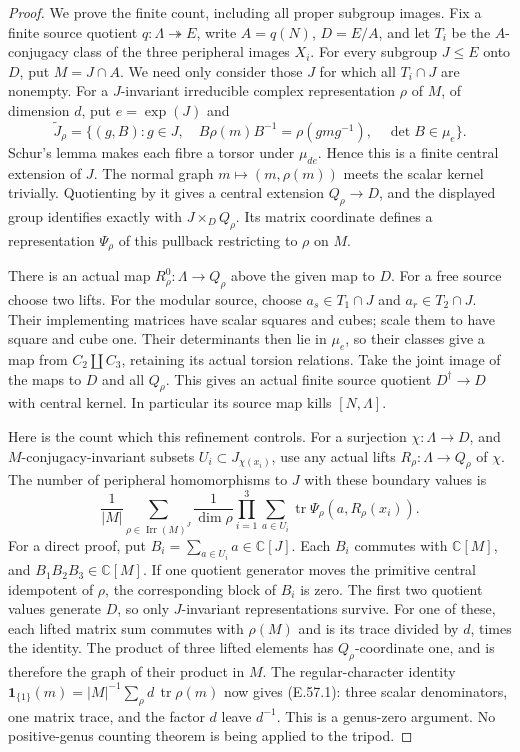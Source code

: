 \begin{proof}
We prove the finite count, including all proper subgroup images.
Fix a finite source quotient \(q:\Lambda\twoheadrightarrow E\),
write \(A=q(N)\), \(D=E/A\), and let \(T_i\) be the
\(A\)-conjugacy class of the three peripheral images \(X_i\).
For every subgroup \(J\le E\) onto \(D\), put \(M=J\cap A\).
We need only consider those \(J\) for which all \(T_i\cap J\)
are nonempty. For a \(J\)-invariant irreducible complex representation
\(\rho\) of \(M\), of dimension \(d\), put \(e=\exp(J)\) and
\[
 \widetilde J_\rho=\{(g,B):g\in J,\quad
 B\rho(m)B^{-1}=\rho(gmg^{-1}),\quad\det B\in\mu_e\}.
\]
Schur's lemma makes each fibre a torsor under \(\mu_{de}\).
Hence this is a finite central extension of \(J\). The normal graph
\(m\mapsto(m,\rho(m))\) meets the scalar kernel trivially.
Quotienting by it gives a central extension \(Q_\rho\to D\),
and the displayed group identifies exactly with
\(J\times_DQ_\rho\). Its matrix coordinate defines a representation
\(\Psi_\rho\) of this pullback restricting to \(\rho\) on \(M\).

There is an actual map \(R_\rho^0:\Lambda\to Q_\rho\) above
the given map to \(D\). For a free source choose two lifts. For the
modular source, choose \(a_s\in T_1\cap J\) and
\(a_r\in T_2\cap J\). Their implementing matrices have scalar
squares and cubes; scale them to have square and cube one. Their
determinants then lie in \(\mu_e\), so their classes give a map
from \(C_2\amalg C_3\), retaining its actual torsion relations.
Take the joint image of the maps to \(D\) and all \(Q_\rho\).
This gives an actual finite source quotient \(D^\dagger\to D\)
with central kernel. In particular its source map kills
\([N,\Lambda]\).

Here is the count which this refinement controls. For a surjection
\(\chi:\Lambda\to D\), and \(M\)-conjugacy-invariant subsets
\(U_i\subset J_{\chi(x_i)}\), use any actual lifts
\(R_\rho:\Lambda\to Q_\rho\) of \(\chi\). The number of
peripheral homomorphisms to \(J\) with these boundary values is
\[
 \frac1{|M|}\sum_{\rho\in\operatorname{Irr}(M)^J}
 \frac1{\dim\rho}
 \prod_{i=1}^3\sum_{a\in U_i}
             \operatorname{tr}\Psi_\rho(a,R_\rho(x_i)).
 \tag{E.57.1}
\]
For a direct proof, put \(B_i=\sum_{a\in U_i}a\in\mathbb C[J]\).
Each \(B_i\) commutes with \(\mathbb C[M]\), and
\(B_1B_2B_3\in\mathbb C[M]\). If one quotient generator moves
the primitive central idempotent of \(\rho\), the corresponding
block of \(B_i\) is zero. The first two quotient values generate
\(D\), so only \(J\)-invariant representations survive.
For one of these, each lifted matrix sum commutes with \(\rho(M)\)
and is its trace divided by \(d\), times the identity. The product
of three lifted elements has \(Q_\rho\)-coordinate one, and is
therefore the graph of their product in \(M\). The regular-character
identity \(\mathbf1_{\{1\}}(m)=|M|^{-1}\sum_\rho d\,
\operatorname{tr}\rho(m)\) now gives (E.57.1): three scalar
denominators, one matrix trace, and the factor \(d\) leave \(d^{-1}\).
This is a genus-zero argument. No positive-genus counting theorem is
being applied to the tripod.


\end{proof}
